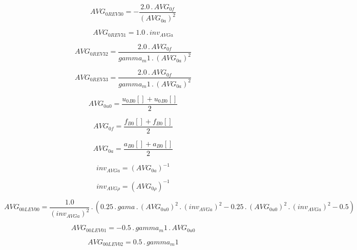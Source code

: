 \documentclass{article}
\begin{document}
\begin{dmath}AVG_{0 REV 30} = - \frac{2.0 \,.\, AVG_{0 f}}{\left(AVG_{0 a} \right)^{2}}\end{dmath}

\begin{dmath}AVG_{0 REV 31} = 1.0 \,.\, inv_{AVG a}\end{dmath}

\begin{dmath}AVG_{0 REV 32} = \frac{2.0 \,.\, AVG_{0 f}}{gamma_m1 \,.\, \left(AVG_{0 a} \right)^{2}}\end{dmath}

\begin{dmath}AVG_{0 REV 33} = \frac{2.0 \,.\, AVG_{0 f}}{gamma_m1 \,.\, \left(AVG_{0 a} \right)^{2}}\end{dmath}

\begin{dmath}AVG_{0 u0} = \frac{{u_{0}{_{B0}}}[{}] + {u_{0}{_{B0}}}[{}]}{2}\end{dmath}

\begin{dmath}AVG_{0 f} = \frac{{f{_{B0}}}[{}] + {f{_{B0}}}[{}]}{2}\end{dmath}

\begin{dmath}AVG_{0 a} = \frac{{a{_{B0}}}[{}] + {a{_{B0}}}[{}]}{2}\end{dmath}

\begin{dmath}inv_{AVG a} = \left(AVG_{0 a} \right)^{-1}\end{dmath}

\begin{dmath}inv_{AVG \rho} = \left(AVG_{0 \rho} \right)^{-1}\end{dmath}

\begin{dmath}AVG_{0 0 LEV 00} = \frac{1.0}{\left(inv_{AVG a} \right)^{2}} \,.\, \left(0.25 \,.\, gama \,.\, \left(AVG_{0 u0} \right)^{2} \,.\, \left(inv_{AVG a} \right)^{2} - 0.25 \,.\, \left(AVG_{0 u0} \right)^{2} \,.\, \left(inv_{AVG a} \right)^{2} 
- 0.5\right)\end{dmath}

\begin{dmath}AVG_{0 0 LEV 01} = - 0.5 \,.\, gamma_m1 \,.\, AVG_{0 u0}\end{dmath}

\begin{dmath}AVG_{0 0 LEV 02} = 0.5 \,.\, gamma_m1\end{dmath}
\end{document}
